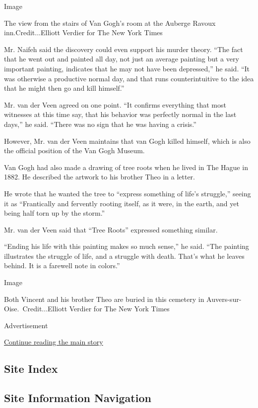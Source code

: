 Image

The view from the stairs of Van Gogh's room at the Auberge Ravoux
inn.Credit...Elliott Verdier for The New York Times

Mr. Naifeh said the discovery could even support his murder theory.
``The fact that he went out and painted all day, not just an average
painting but a very important painting, indicates that he may not have
been depressed,'' he said. ``It was otherwise a productive normal day,
and that runs counterintuitive to the idea that he might then go and
kill himself.''

Mr. van der Veen agreed on one point. ``It confirms everything that most
witnesses at this time say, that his behavior was perfectly normal in
the last days,'' he said. ``There was no sign that he was having a
crisis.''

However, Mr. van der Veen maintains that van Gogh killed himself, which
is also the official position of the Van Gogh Museum.

Van Gogh had also made a drawing of tree roots when he lived in The
Hague in 1882. He described the artwork to his brother Theo in a letter.

He wrote that he wanted the tree to ``express something of life's
struggle,'' seeing it as ``Frantically and fervently rooting itself, as
it were, in the earth, and yet being half torn up by the storm.''

Mr. van der Veen said that ``Tree Roots'' expressed something similar.

``Ending his life with this painting makes so much sense,'' he said.
``The painting illustrates the struggle of life, and a struggle with
death. That's what he leaves behind. It is a farewell note in colors.''

Image

Both Vincent and his brother Theo are buried in this cemetery in
Auvers-sur-Oise.~Credit...Elliott Verdier for The New York Times

Advertisement

\protect\hyperlink{after-bottom}{Continue reading the main story}

\hypertarget{site-index}{%
\subsection{Site Index}\label{site-index}}

\hypertarget{site-information-navigation}{%
\subsection{Site Information
Navigation}\label{site-information-navigation}}

